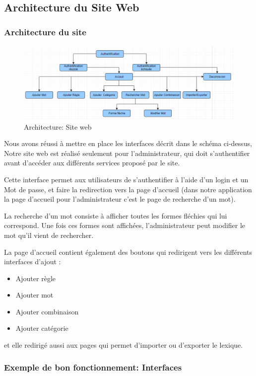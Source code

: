 \documentclass[12pt,a4paper]{article}
\begin{document}
\subsection{ Architecture du Site Web }
\subsubsection{Architecture du site} 

\begin{figure}[h]
\centering
\includegraphics[width=150mm]{img/site.PNG}
\caption{Architecture: Site web}
\label{Tux}
\end{figure}


Nous avons réussi à mettre en place les interfaces décrit dans le schéma ci-dessus,
Notre site web est réalisé seulement pour l'administrateur, qui doit s'authentifier
avant d'accéder aux différents services proposé par le site.

Cette interface permet aux utilisateurs de s'authentifier à l’aide d'un login et un Mot de passe, 
et faire la redirection vers la page d'accueil (dans notre application la page d'accueil
pour l'administrateur c'est le page de recherche d'un mot).

La recherche d'un mot consiste à afficher toutes les formes fléchies qui lui correspond. Une fois ces formes sont affichées, 
l'administrateur peut modifier le mot qu'il vient de rechercher.

La page d'accueil contient également des boutons qui redirigent vers les différents interfaces d'ajout : 
\begin{itemize}
    \item   Ajouter règle
    \item   Ajouter mot
    \item   Ajouter combinaison
    \item   Ajouter catégorie
   \end{itemize}
et elle redirigé aussi aux  pages qui permet d'importer ou d'exporter le lexique.


\subsubsection{Exemple de bon fonctionnement: Interfaces} 
\end{document}

